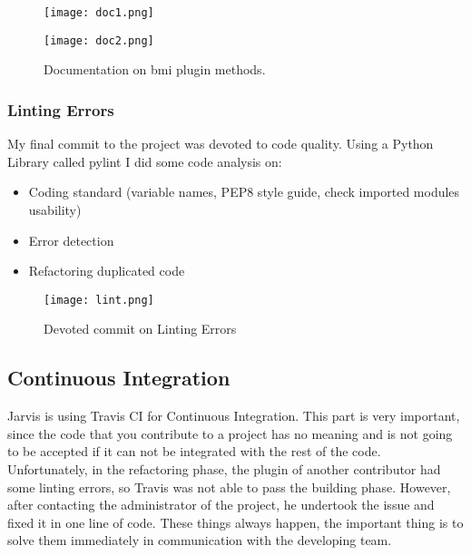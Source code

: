 \documentclass[12pt]{article}
\begin{document}
  \begin{figure}[h]
  \centering
  \begin{minipage}[b]{0.9\textwidth}
    \texttt{[image: doc1.png]}
  \end{minipage}
  \hfill
  \begin{minipage}[b]{0.9\textwidth}
    \texttt{[image: doc2.png]}
    \caption{Documentation on bmi plugin methods.}
  \end{minipage}
\end{figure}
  
  \subsubsection{Linting Errors}
  
 
  
    My final commit to the project was devoted to code quality. Using a Python Library called pylint I did some code analysis on:
    \begin{itemize}
    \item Coding standard (variable names, PEP8 style guide, check imported modules usability)
    \item Error detection
    \item Refactoring duplicated code
    \end{itemize}
    
     \begin{figure}[tph!]
\centerline{\texttt{[image: lint.png]}}
    \caption{Devoted commit on Linting Errors}
    \label{fig:verticalcell}
\end{figure}
    
    
  \subsection{Continuous Integration}
    
    Jarvis is using Travis CI for Continuous Integration. This part is very important, since the code that you contribute to a project has no meaning and is not going to be accepted if it can not be integrated with the rest of the code. Unfortunately, in the refactoring phase, the plugin of another contributor had some linting errors, so Travis was not able to pass the building phase. However, after contacting the administrator of the project, he undertook the issue and fixed it in one line of code. These things always happen, the important thing is to solve them immediately in communication with the developing team.
      
\end{document}
